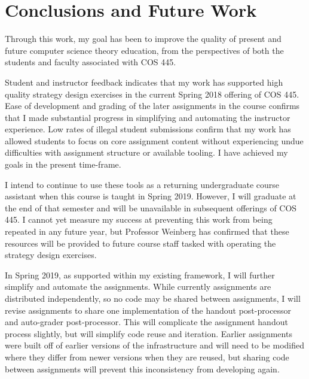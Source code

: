 \documentclass[pageno]{jpaper}
\begin{document}


\section*{Conclusions and Future Work}
Through this work, my goal has been to improve the quality of present and future computer science theory education, from the perspectives of both the students and faculty associated with COS 445.

Student and instructor feedback indicates that my work has supported high quality strategy design exercises in the current Spring 2018 offering of COS 445.
Ease of development and grading of the later assignments in the course confirms that I made substantial progress in simplifying and automating the instructor experience.
Low rates of illegal student submissions confirm that my work has allowed students to focus on core assignment content without experiencing undue difficulties with assignment structure or available tooling.
I have achieved my goals in the present time-frame.

I intend to continue to use these tools as a returning undergraduate course assistant when this course is taught in Spring 2019.
However, I will graduate at the end of that semester and will be unavailable in subsequent offerings of COS 445.
I cannot yet measure my success at preventing this work from being repeated in any future year, but Professor Weinberg has confirmed that these resources will be provided to future course staff tasked with operating the strategy design exercises.

In Spring 2019, as supported within my existing framework, I will further simplify and automate the assignments.
While currently assignments are distributed independently, so no code may be shared between assignments, I will revise assignments to share one implementation of the handout post-processor and auto-grader post-processor.
This will complicate the assignment handout process slightly, but will simplify code reuse and iteration.
Earlier assignments were built off of earlier versions of the infrastructure and will need to be modified where they differ from newer versions when they are reused, but sharing code between assignments will prevent this inconsistency from developing again.
\end{document}

